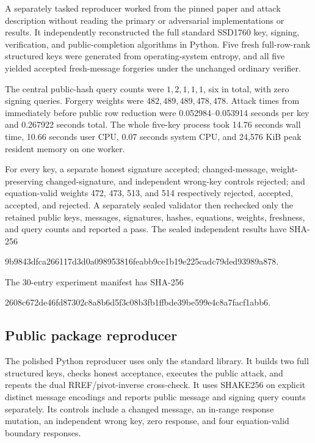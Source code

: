 \documentclass[10pt,a4paper]{article}
\begin{document}
A separately tasked reproducer worked from the pinned paper and attack
description without reading the primary or adversarial implementations or
results. It independently reconstructed the full standard SSD1760 key,
signing, verification, and public-completion algorithms in Python. Five fresh
full-row-rank structured keys were generated from operating-system entropy,
and all five yielded accepted fresh-message forgeries under the unchanged
ordinary verifier.

The central public-hash query counts were $1,2,1,1,1$, six in total, with zero
signing queries. Forgery weights were $482,489,489,478,478$. Attack times from
immediately before public row reduction were 0.052984--0.053914 seconds per
key and 0.267922 seconds total. The whole five-key process took 14.76 seconds
wall time, 10.66 seconds user CPU, 0.07 seconds system CPU, and 24,576 KiB peak
resident memory on one worker.

For every key, a separate honest signature accepted; changed-message,
weight-preserving changed-signature, and independent wrong-key controls
rejected; and equation-valid weights 472, 473, 513, and 514 respectively
rejected, accepted, accepted, and rejected. A separately sealed validator then
rechecked only the retained public keys, messages, signatures, hashes,
equations, weights, freshness, and query counts and reported a pass. The sealed
independent results have SHA-256
\begin{center}
\small\ttfamily
9b9843dfca266117d3d0a098953816feabb9ce1b19e225cadc79ded93989a878.
\end{center}
The 30-entry experiment manifest has SHA-256
\begin{center}
\small\ttfamily
2608c672de46fd87302c8a8b6d5f3c08b3fb1ffbde39be599e4c8a7facf1abb6.
\end{center}

\subsection{Public package reproducer}

The polished Python reproducer uses only the standard library. It builds two
full structured keys, checks honest acceptance, executes the public attack,
and repeats the dual RREF/pivot-inverse cross-check. It uses SHAKE256 on
explicit distinct message encodings and reports public message and signing
query counts separately. Its controls include a changed message, an in-range
response mutation, an independent wrong key, zero response, and four
equation-valid boundary responses.
\end{document}
